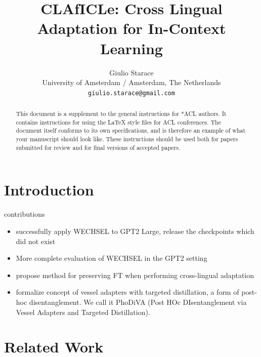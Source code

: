 \documentclass[11pt]{article}
\title{CLAfICLe: Cross Lingual Adaptation for In-Context Learning}
\author{Giulio Starace \\
  University of Amsterdam / Amsterdam, The Netherlands \\
  \texttt{giulio.starace@gmail.com} \\}
\begin{document}
\maketitle
\begin{abstract}
	This document is a supplement to the general instructions for *ACL authors. It contains instructions for using the \LaTeX{} style files for ACL conferences.
	The document itself conforms to its own specifications, and is therefore an example of what your manuscript should look like.
	These instructions should be used both for papers submitted for review and for final versions of accepted papers.
\end{abstract}

\section{Introduction}

contributions
\begin{itemize}
	\item successfully apply WECHSEL to GPT2 Large, release the checkpoints which did not exist
	\item More complete evaluation of WECHSEL in the GPT2 setting
	\item propose method for preserving FT when performing cross-lingual adaptation
	\item formalize concept of vessel adapters with targeted distillation, a form of post-hoc
	      disentanglement. We call it PhoDiVA (Post HOc DIsentanglement via Vessel Adapters and
	      Targeted Distillation).
\end{itemize}

\section{Related Work}
\end{document}
